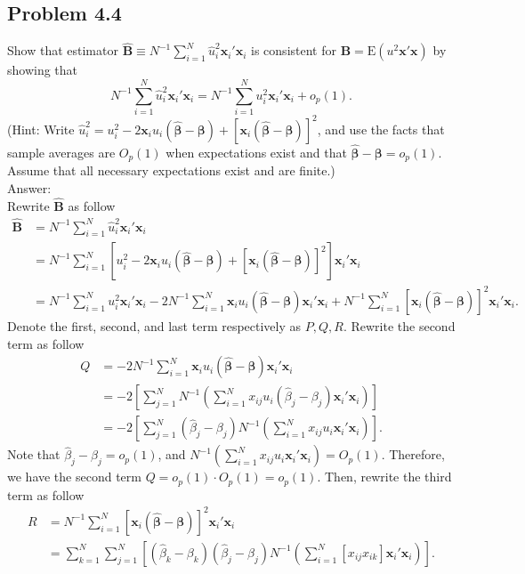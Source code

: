 \documentclass[10pt]{article}
\newcommand{\E}{\text{E}}
\begin{document}
\subsection*{Problem 4.4}
Show that estimator $\hat{\mathbf{B}}\equiv N^{-1} \sum_{i=1}^{N}\hat{u}_i^2 \mathbf{x}_i'\mathbf{x}_i$ is consistent for $\mathbf{B}=\E(u^2\mathbf{x}'\mathbf{x})$ by showing that 
\[N^{-1} \sum_{i=1}^{N}\hat{u}_i^2 \mathbf{x}_i'\mathbf{x}_i=N^{-1} \sum_{i=1}^{N}u_i^2 \mathbf{x}_i'\mathbf{x}_i+o_p(1).\]
(Hint: Write $\hat{u}_i^2=u_i^2-2\mathbf{x}_i u_i (\pmb{\hat{\beta}}-\pmb{\beta})+[\mathbf{x}_i (\pmb{\hat{\beta}}-\pmb{\beta})]^2$, and use the facts that sample averages are $O_p(1)$ when expectations exist and that $\pmb{\hat{\beta}}-\pmb{\beta}=o_p(1).$ Assume that all necessary expectations exist and are finite.)
\\ Answer:\\
Rewrite $\hat{\mathbf{B}}$ as follow
\begin{align*}
    \hat{\mathbf{B}}&= N^{-1} \sum_{i=1}^{N}\hat{u}_i^2 \mathbf{x}_i'\mathbf{x}_i \\
    &=N^{-1} \sum_{i=1}^{N}\left[u_i^2-2\mathbf{x}_i u_i (\pmb{\hat{\beta}}-\pmb{\beta})+[\mathbf{x}_i (\pmb{\hat{\beta}}-\pmb{\beta})]^2\right] \mathbf{x}_i'\mathbf{x}_i \\
    &=N^{-1} \sum_{i=1}^{N}u_i^2 \mathbf{x}_i'\mathbf{x}_i
    -2N^{-1} \sum_{i=1}^{N}\mathbf{x}_i u_i (\pmb{\hat{\beta}}-\pmb{\beta})\mathbf{x}_i'\mathbf{x}_i
    +N^{-1} \sum_{i=1}^{N}[\mathbf{x}_i (\pmb{\hat{\beta}}-\pmb{\beta})]^2 \mathbf{x}_i'\mathbf{x}_i.
\end{align*}
Denote the first, second, and last term respectively as $P, Q, R$. Rewrite the second term as follow
\begin{align*}
    Q&=-2N^{-1} \sum_{i=1}^{N}\mathbf{x}_i u_i (\pmb{\hat{\beta}}-\pmb{\beta})\mathbf{x}_i'\mathbf{x}_i\\
    &=-2\left[\sum_{j=1}^{N}N^{-1}\left(\sum_{i=1}^{N}x_{ij}u_i (\hat{\beta}_j-\beta_j)\mathbf{x}_i'\mathbf{x}_i\right)\right]\\
    &=-2\left[\sum_{j=1}^{N}(\hat{\beta}_j-\beta_j)N^{-1}\left(\sum_{i=1}^{N}x_{ij}u_i \mathbf{x}_i'\mathbf{x}_i\right)\right].
\end{align*}
Note that $\hat{\beta}_j-\beta_j=o_p(1)$, and $N^{-1}\left(\sum_{i=1}^{N}x_{ij}u_i \mathbf{x}_i'\mathbf{x}_i\right)=O_p(1).$ Therefore, we have the second term $Q=o_p(1)\cdot O_p(1)=o_p(1).$
Then, rewrite the third term as follow
\begin{align*}
    R&=N^{-1} \sum_{i=1}^{N}[\mathbf{x}_i (\pmb{\hat{\beta}}-\pmb{\beta})]^2 \mathbf{x}_i'\mathbf{x}_i\\
    &=\sum_{k=1}^{N}\sum_{j=1}^{N}\left[(\hat{\beta}_k-\beta_k)(\hat{\beta}_j-\beta_j)N^{-1}\left(\sum_{i=1}^{N}[x_{ij}x_{ik}] \mathbf{x}_i'\mathbf{x}_i\right)\right].
\end{align*}
\end{document}
